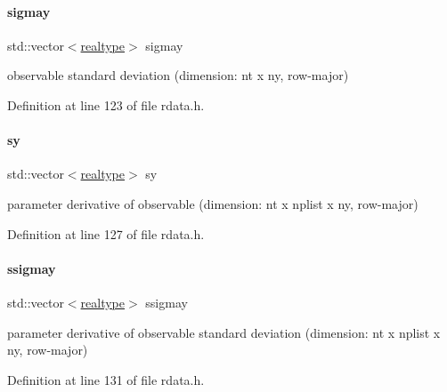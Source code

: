\paragraph{\texorpdfstring{sigmay}{sigmay}}
{\footnotesize\ttfamily std\+::vector$<$\mbox{\hyperlink{namespaceamici_a1bdce28051d6a53868f7ccbf5f2c14a3}{realtype}}$>$ sigmay}

observable standard deviation (dimension\+: nt x ny, row-\/major) 

Definition at line 123 of file rdata.\+h.

\mbox{\label{classamici_1_1_return_data_afae9aa5147266c51f0ac5004f1cdfbe0}} 
\paragraph{\texorpdfstring{sy}{sy}}
{\footnotesize\ttfamily std\+::vector$<$\mbox{\hyperlink{namespaceamici_a1bdce28051d6a53868f7ccbf5f2c14a3}{realtype}}$>$ sy}

parameter derivative of observable (dimension\+: nt x nplist x ny, row-\/major) 

Definition at line 127 of file rdata.\+h.

\mbox{\label{classamici_1_1_return_data_a7a8085d13686e18d9575fabf3a289e10}} 
\paragraph{\texorpdfstring{ssigmay}{ssigmay}}
{\footnotesize\ttfamily std\+::vector$<$\mbox{\hyperlink{namespaceamici_a1bdce28051d6a53868f7ccbf5f2c14a3}{realtype}}$>$ ssigmay}

parameter derivative of observable standard deviation (dimension\+: nt x nplist x ny, row-\/major) 

Definition at line 131 of file rdata.\+h.

\mbox{\label{classamici_1_1_return_data_ac3a3eb1d5c3af27a82a144086eafc832}} 
